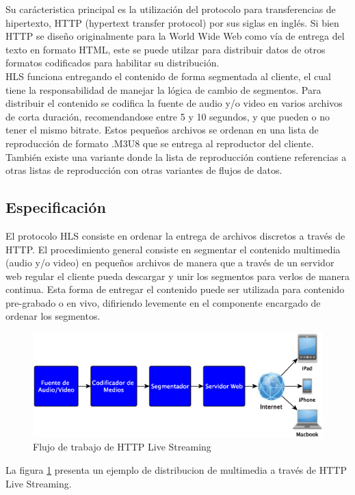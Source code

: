 Su carácteristica principal es la utilización del protocolo para transferencias de hipertexto, HTTP (hypertext transfer protocol) por sus siglas en inglés. Si bien HTTP se diseño originalmente para la World Wide Web como vía de entrega del texto en formato HTML, este se puede utilzar para distribuir datos de otros formatos codificados para habilitar su distribución.\\

HLS funciona entregando el contenido de forma segmentada al cliente, el cual tiene la responsabilidad de manejar la lógica de cambio de segmentos. Para distribuir el contenido se codifica la fuente de audio y/o video en varios archivos de corta duración, recomendandose entre 5 y 10 segundos, y que pueden o no tener el mismo bitrate. Estos pequeños archivos se ordenan en una lista de reproducción de formato .M3U8 que se entrega al reproductor del cliente. \\
También existe una variante donde la lista de reproducción contiene referencias a otras listas de reproducción con otras variantes de flujos de datos. \\

	\subsection{Especificación}
		El protocolo HLS consiste en ordenar la entrega de archivos discretos a través de HTTP.
		El procedimiento general consiste en segmentar el contenido multimedia (audio y/o video) en pequeños archivos de manera que a través de un servidor web regular el cliente pueda descargar y unir los segmentos para verlos de manera continua. Esta forma de entregar el contenido puede ser utilizada para contenido pre-grabado o en vivo, difiriendo levemente en el componente encargado de ordenar los segmentos.\\
		

\clearpage		
\begin{figure}[H]
	\centering
	\includegraphics[scale=0.5]{imgs/HLS_diagram_wwdc2010.eps}
	\caption{Flujo de trabajo de HTTP Live Streaming}	
	\label{diagramaHLSwwdc2010}
\end{figure}		
		La figura \ref{diagramaHLSwwdc2010} presenta un ejemplo de distribucion de multimedia a través de HTTP Live Streaming.\\
		
